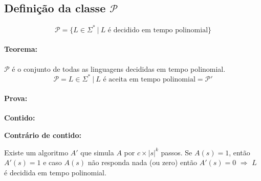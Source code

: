 \documentclass[a4paper,oneside,article,table]{article}
\renewcommand{\P}{\mathcal{P}}
\begin{document}
    \subsection{Definição da classe $\P$}

        \[\P = \{ L \in \Sigma^*~|~L \textrm{ é decidido em tempo polinomial} \}\]

        \paragraph{Teorema:} $\P$ é o conjunto de todas as linguagens decididas em tempo polinomial.
        \[\P = L \in \Sigma^*~|~L \textrm{ é aceita em tempo polinomial} = \P'\]

        \paragraph{Prova:}
        \begin{description}
            \item \textbf{Contido:}
                \begin{description}
 
                \end{description}
            \item\textbf{Contrário de contido:}
                \begin{description}

            \end{description}
    \end{description}

        Existe um algoritmo $A'$ que simula $A$ por $c\times|s|^k$ passos. Se $A(s)=1$, então $A'(s) = 1$ e caso $A(s)$ não responda nada (ou zero) então $A'(s) = 0$ $\Rightarrow$  $L$ é decidida em tempo polinomial.
\end{document}
